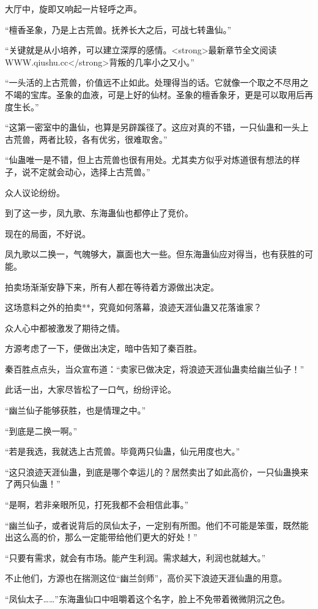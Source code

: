 \begin{this_body}
大厅中，旋即又响起一片轻呼之声。

“檀香圣象，乃是上古荒兽。抚养长大之后，可战七转蛊仙。”

“关键就是从小培养，可以建立深厚的感情。<strong>最新章节全文阅读WWW.qiushu.cc</strong>背叛的几率小之又小。”

“一头活的上古荒兽，价值远不止如此。处理得当的话。它就像一个取之不尽用之不竭的宝库。圣象的血液，可是上好的仙材。圣象的檀香象牙，更是可以取用后再度生长。”

“这第一密室中的蛊仙，也算是另辟蹊径了。这应对真的不错，一只仙蛊和一头上古荒兽，两者比较，各有优劣，很难取舍。”

“仙蛊唯一是不错，但上古荒兽也很有用处。尤其卖方似乎对炼道很有想法的样子，说不定就会动心，选择上古荒兽。”

众人议论纷纷。

到了这一步，凤九歌、东海蛊仙也都停止了竞价。

现在的局面，不好说。

凤九歌以二换一，气魄够大，赢面也大一些。但东海蛊仙应对得当，也有获胜的可能。

拍卖场渐渐安静下来，所有人都在等待着方源做出决定。

这场意料之外的拍卖**，究竟如何落幕，浪迹天涯仙蛊又花落谁家？

众人心中都被激发了期待之情。

方源考虑了一下，便做出决定，暗中告知了秦百胜。

秦百胜点点头，当众宣布道：“卖家已做决定，将浪迹天涯仙蛊卖给幽兰仙子！”

此话一出，大家尽皆松了一口气，纷纷评论。

“幽兰仙子能够获胜，也是情理之中。”

“到底是二换一啊。”

“若是我选，我就选上古荒兽。毕竟两只仙蛊，仙元用度也大。”

“这只浪迹天涯仙蛊，到底是哪个幸运儿的？居然卖出了如此高价，一只仙蛊换来了两只仙蛊！”

“是啊，若非亲眼所见，打死我都不会相信此事。”

“幽兰仙子，或者说背后的凤仙太子，一定别有所图。他们不可能是笨蛋，既然能出这么高的价，那么一定能带给他们更大的好处！”

“只要有需求，就会有市场。能产生利润。需求越大，利润也就越大。”

不止他们，方源也在揣测这位“幽兰剑师”，高价买下浪迹天涯仙蛊的用意。

“凤仙太子……”东海蛊仙口中咀嚼着这个名字，脸上不免带着微微阴沉之色。


\end{this_body}
